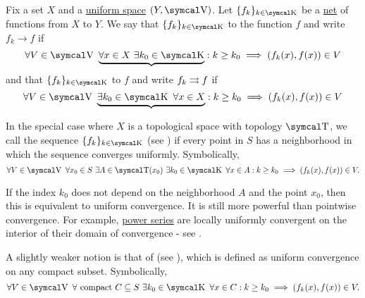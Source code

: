 \begin{definition}\label{def:function_net_convergence}
  Fix a set \( X \) and a \hyperref[def:uniform_space]{uniform space} \( (Y, \CV) \). Let \( \{ f_k \}_{k \in \CK} \) be a \hyperref[def:topological_net]{net} of functions from \( X \) to \( Y \). We say that \( \{ f_k \}_{k \in \CK} \)  to the function \( f \) and write \( f_k \to f \) if
  \begin{equation}\label{def:function_net_convergence/pointwise}
    \forall V \in \CV \ \underbrace{\forall x \in X \ \exists k_0 \in \CK} : k \geq k_0 \implies (f_k(x), f(x)) \in V
  \end{equation}
  and that \( \{ f_k \}_{k \in \CK} \)  to \( f \) and write \( f_k \rightrightarrows f \) if
  \begin{equation}\label{def:function_net_convergence/uniform}
    \forall V \in \CV \ \underbrace{\exists k_0 \in \CK \ \forall x \in X} : k \geq k_0 \implies (f_k(x), f(x)) \in V
  \end{equation}

  In the special case where \( X \) is a topological space with topology \( \CT \), we call the sequence \( \{ f_k \}_{k \in \CK} \)  (see \cite{ProofWiki:locally_uniform_convergence}) if every point in \( S \) has a neighborhood in which the sequence converges uniformly. Symbolically,
  \begin{equation}\label{def:function_net_convergence/locally_uniform}
    \forall V \in \CV \ \forall x_0 \in S \ \exists A \in \CT(x_0) \ \exists k_0 \in \CK \ \forall x \in A : k \geq k_0 \implies (f_k(x), f(x)) \in V.
  \end{equation}

  If the index \( k_0 \) does not depend on the neighborhood \( A \) and the point \( x_0 \), then this is equivalent to uniform convergence. It is still more powerful than pointwise convergence. For example, \hyperref[def:convergent_power_series]{power series} are locally uniformly convergent on the interior of their domain of convergence - see .

  A slightly weaker notion is that of  (see \cite{ProofWiki:compact_convergence}), which is defined as uniform convergence on any compact subset. Symbolically,
  \begin{equation}\label{def:function_net_convergence/compact}
    \forall V \in \CV \ \forall \text{ compact } C \subseteq S \ \exists k_0 \in \CK \ \forall x \in C : k \geq k_0 \implies (f_k(x), f(x)) \in V.
  \end{equation}
\end{definition}

